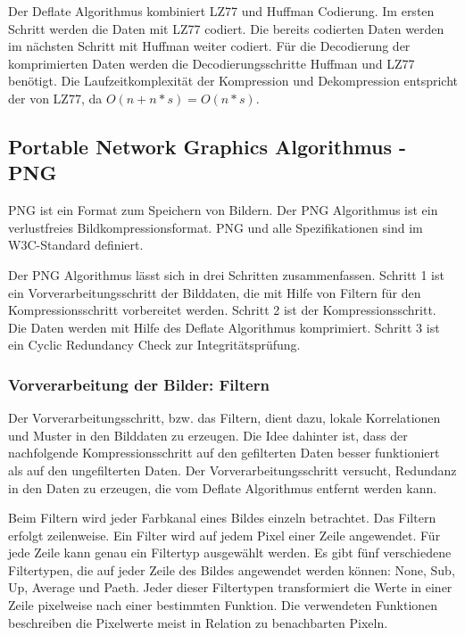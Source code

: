 \documentclass[conference]{IEEEtran}
\begin{document}
Der Deflate Algorithmus kombiniert LZ77 und Huffman Codierung.
Im ersten Schritt werden die Daten mit LZ77 codiert.
Die bereits codierten Daten werden im nächsten Schritt mit Huffman weiter codiert.
Für die Decodierung der komprimierten Daten werden die Decodierungsschritte Huffman 
und LZ77 benötigt.
Die Laufzeitkomplexität der Kompression und Dekompression entspricht der von 
LZ77, da $O(n + n * s) = O(n * s)$.


\subsection{Portable Network Graphics Algorithmus - PNG}

PNG ist ein Format zum Speichern von Bildern. 
Der PNG Algorithmus ist ein verlustfreies Bildkompressionsformat. 
PNG und alle Spezifikationen sind im W3C-Standard \cite{w3c} definiert. 

Der PNG Algorithmus lässt sich in drei Schritten zusammenfassen.
Schritt 1 ist ein Vorverarbeitungsschritt der Bilddaten, die mit Hilfe von
Filtern für den Kompressionsschritt vorbereitet werden.
Schritt 2 ist der Kompressionsschritt.
Die Daten werden mit Hilfe des Deflate Algorithmus komprimiert.
Schritt 3 ist ein Cyclic Redundancy Check zur Integritätsprüfung.


\subsubsection{Vorverarbeitung der Bilder: Filtern}

Der Vorverarbeitungsschritt, bzw. das Filtern, dient dazu, lokale Korrelationen und
Muster in den Bilddaten zu erzeugen.
Die Idee dahinter ist, dass der nachfolgende Kompressionsschritt auf den gefilterten 
Daten besser funktioniert als auf den ungefilterten Daten. 
Der Vorverarbeitungsschritt versucht, Redundanz in den Daten zu erzeugen, die 
vom Deflate Algorithmus entfernt werden kann. 

Beim Filtern wird jeder Farbkanal eines Bildes einzeln betrachtet.
Das Filtern erfolgt zeilenweise.
Ein Filter wird auf jedem Pixel einer Zeile angewendet.
Für jede Zeile kann genau ein Filtertyp ausgewählt werden.
Es gibt fünf verschiedene Filtertypen, die auf jeder Zeile
des Bildes angewendet werden können: None, Sub, Up, Average und Paeth.
Jeder dieser Filtertypen transformiert die Werte in einer Zeile pixelweise nach einer 
bestimmten Funktion.
Die verwendeten Funktionen beschreiben die Pixelwerte meist in Relation zu benachbarten 
Pixeln.
\end{document}
